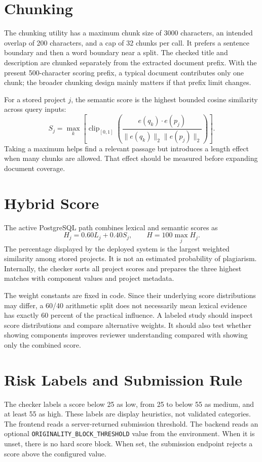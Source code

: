 \documentclass[12pt,a4paper]{report}
\begin{document}
\section{Chunking}
The chunking utility has a maximum chunk size of 3000 characters, an intended overlap of 200 characters, and a cap of 32 chunks per call. It prefers a sentence boundary and then a word boundary near a split. The checked title and description are chunked separately from the extracted document prefix. With the present 500-character scoring prefix, a typical document contributes only one chunk; the broader chunking design mainly matters if that prefix limit changes.

For a stored project $j$, the semantic score is the highest bounded cosine similarity across query inputs:
\begin{equation}S_j=\max_k\left[\operatorname{clip}_{[0,1]}
\left(\frac{e(q_k)\cdot e(p_j)}{\|e(q_k)\|_2\|e(p_j)\|_2}\right)\right].\end{equation}
Taking a maximum helps find a relevant passage but introduces a length effect when many chunks are allowed. That effect should be measured before expanding document coverage.

\section{Hybrid Score}
The active PostgreSQL path combines lexical and semantic scores as
\begin{equation}H_j=0.60L_j+0.40S_j,\qquad H=100\max_j H_j.\end{equation}
The percentage displayed by the deployed system is the largest weighted similarity among stored projects. It is not an estimated probability of plagiarism. Internally, the checker sorts all project scores and prepares the three highest matches with component values and project metadata.

The weight constants are fixed in code. Since their underlying score distributions may differ, a 60/40 arithmetic split does not necessarily mean lexical evidence has exactly 60 percent of the practical influence. A labeled study should inspect score distributions and compare alternative weights. It should also test whether showing components improves reviewer understanding compared with showing only the combined score.

\section{Risk Labels and Submission Rule}
The checker labels a score below 25 as low, from 25 to below 55 as medium, and at least 55 as high. These labels are display heuristics, not validated categories. The frontend reads a server-returned submission threshold. The backend reads an optional \texttt{ORIGINALITY\_BLOCK\_THRESHOLD} value from the environment. When it is unset, there is no hard score block. When set, the submission endpoint rejects a score above the configured value.
\end{document}

